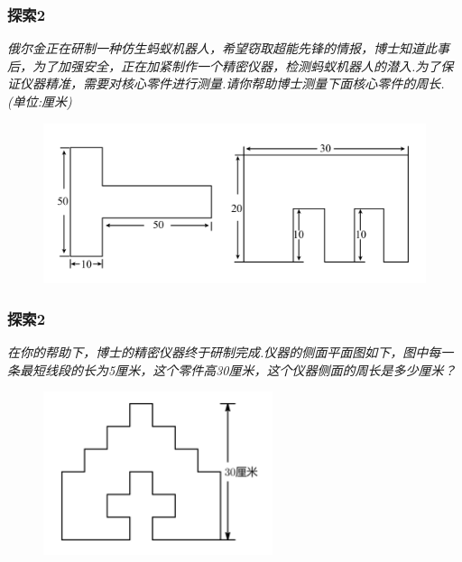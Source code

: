 \begin{frame}
    \frametitle{探索2}
    \textit{俄尔金正在研制一种仿生蚂蚁机器人，希望窃取超能先锋的情报，博士知道此事后，为了加强安全，正在加紧制作一个精密仪器，检测蚂蚁机器人的潜入.为了保证仪器精准，需要对核心零件进行测量.请你帮助博士测量下面核心零件的周长.(单位:厘米)}
    \begin{figure}[H] 
        \centering
        \includegraphics[width=1\textwidth]{./pics/Chapter_1/tansuo2.png}
    \end{figure}
\end{frame}

\begin{frame}
    \frametitle{探索2}
    \textit{在你的帮助下，博士的精密仪器终于研制完成.仪器的侧面平面图如下，图中每一条最短线段的长为5厘米，这个零件高30厘米，这个仪器侧面的周长是多少厘米？}
    \begin{figure}[H] 
        \centering
        \includegraphics[width=0.6\textwidth]{./pics/Chapter_1/tansuo2_2.png}
    \end{figure}
\end{frame}

